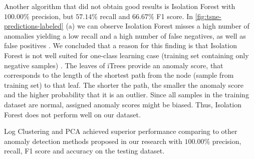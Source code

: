 Another algorithm that did not obtain good results is Isolation Forest with $100.00\%$ precision, but $57.14\%$ recall and $66.67\%$ F1 score. In \ref{fig:tsne-predictions-labeled} (a) we can observe Isolation Forest misses a high number of anomalies yielding a low recall and a high number of false negatives, as well as false positives . We concluded that a reason for this finding is that Isolation Forest is not well suited for one-class learning case (training set containing only negative samples) \cite{adForest}. The leaves of iTrees provide an anomaly score, that corresponds to the length of the shortest path from the node (sample from training set) to that leaf. The shorter the path, the smaller the anomaly score and the higher probability that it is an outlier. Since all samples in the training dataset are normal, assigned anomaly scores might be biased. Thus, Isolation Forest does not perform well on our dataset.

Log Clustering and PCA achieved superior performance comparing to other anomaly detection methods proposed in our research with $100.00\%$  precision, recall, F1 score and accuracy on the testing dataset. 

